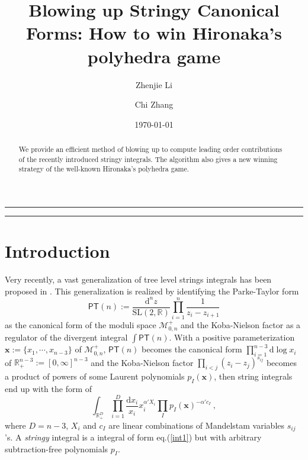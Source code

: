 \documentclass[12pt]{article}
\date{\today}
\title{Blowing up Stringy Canonical Forms: How to win Hironaka's polyhedra game}
\author{Zhenjie Li\and Chi Zhang}
\theoremstyle{definition}
\theoremstyle{plain}
\newcommand{\dif}{\mathrm{d}} %
\begin{document}
\maketitle

\begin{abstract}
We provide an efficient method of blowing up to compute leading order contributions of the recently introduced stringy integrals. 
The algorithm also gives a new winning strategy of the well-known Hironaka's polyhedra game.
\end{abstract}
\newpage

\begin{center}
	\rule{1.0\textwidth}{1pt}
\end{center}
\tableofcontents

\bigskip
\begin{center}
	\rule{1.0\textwidth}{1pt}
\end{center}


\section{Introduction}

Very recently, a vast generalization of tree level strings integrals has been proposed in \cite{Arkani-Hamed:2019mrd}. This generalization is realized by identifying the Parke-Taylor form 
\[
	\mathsf{PT}(n):=\frac{\dif^{n}z}{\mathrm{SL}(2,\mathbb{R})} \prod_{i=1}^{n}\frac{1}{z_{i}-z_{i+1}}
\]
as the canonical form of the moduli space $\mathcal{M}_{0,n}^{+}$ and the Koba-Nielson factor as a regulator of the divergent integral $\int \mathsf{PT}(n)$. With a positive parameterization  $\mathbf{x}:= \{x_{1},\cdots, x_{n-3}\}$  of $\mathcal{M}_{0,n}^{+}$, $\mathsf{PT}(n)$ becomes the canonical form $\prod_{i=1}^{n-3} \dif \log x_{i}$ of $\mathbb{R}_{+}^{n-3}:=[0,\infty]^{n-3}$ and the Koba-Nielson factor $\prod_{i<j} (z_{i}-z_{j})^{s_{ij}}$ becomes a product of powers of some Laurent polynomials $p_{I}(\mathbf{x})$, then string integrals end up with the form of
\begin{equation} 
	\int_{\mathbb{R}_{+}^{D}} \prod_{i=1}^{D}\frac{\dif x_{i}}{x_{i}}x_{i}^{\alpha' X_{i}}\prod_{I}p_{I}(\mathbf{x})^{-\alpha'c_{I}}	\:, \label{int1}
\end{equation}
where $D=n{-}3$, $X_{i}$ and $c_{I}$ are linear combinations of Mandelstam variables $s_{ij}$'s. A \emph{stringy} integral is a integral of form eq.(\ref{int1}) but with arbitrary subtraction-free polynomials $p_{I}$. 
\end{document}
